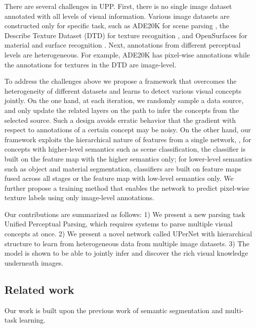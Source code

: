 \documentclass[runningheads]{llncs}
\begin{document}
There are several challenges in UPP. First, there is no single image dataset annotated with all levels of visual information. Various image datasets are constructed only for specific task, such as ADE20K for scene parsing \cite{zhou2017scene}, the Describe Texture Dataset (DTD) for texture recognition \cite{cimpoi2014describing}, and OpenSurfaces for material and surface recognition \cite{bell2013opensurfaces}. Next, annotations from different perceptual levels are heterogeneous. For example, ADE20K has pixel-wise annotations while the annotations for textures in the DTD are image-level. 

To address the challenges above we propose a framework that overcomes the heterogeneity of different datasets and learns to detect various visual concepts jointly. On the one hand, at each iteration, we randomly sample a data source, and only update the related layers on the path to infer the concepts from the selected source. Such a design avoids erratic behavior that the gradient with respect to annotations of a certain concept may be noisy. On the other hand, our framework exploits the hierarchical nature of features from a single network, \ie, for concepts with higher-level semantics such as scene classification, the classifier is built on the feature map with the higher semantics only; for lower-level semantics such as object and material segmentation, classifiers are built on feature maps fused across all stages or the feature map with low-level semantics only. We further propose a training method that enables the network to predict pixel-wise texture labels using only image-level annotations. 

Our contributions are summarized as follows: 1) We present a new parsing task Unified Perceptual Parsing, which requires systems to parse multiple visual concepts at once. 2) We present a novel network called UPerNet with hierarchical structure to learn from heterogeneous data from multiple image datasets. 3) The model is shown to be able to jointly infer and discover the rich visual knowledge underneath images.

\subsection{Related work}

Our work is built upon the previous work of semantic segmentation and multi-task learning. 
\end{document}
